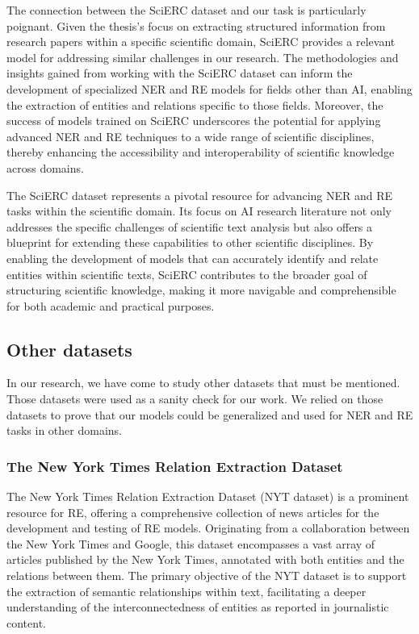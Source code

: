 The connection between the SciERC dataset and our task is particularly poignant. Given the thesis's focus on extracting structured information from research papers within a specific scientific domain, SciERC provides a relevant model for addressing similar challenges in our research. The methodologies and insights gained from working with the SciERC dataset can inform the development of specialized NER and RE models for fields other than AI, enabling the extraction of entities and relations specific to those fields. Moreover, the success of models trained on SciERC underscores the potential for applying advanced NER and RE techniques to a wide range of scientific disciplines, thereby enhancing the accessibility and interoperability of scientific knowledge across domains.

The SciERC dataset represents a pivotal resource for advancing NER and RE tasks within the scientific domain. Its focus on AI research literature not only addresses the specific challenges of scientific text analysis but also offers a blueprint for extending these capabilities to other scientific disciplines. By enabling the development of models that can accurately identify and relate entities within scientific texts, SciERC contributes to the broader goal of structuring scientific knowledge, making it more navigable and comprehensible for both academic and practical purposes.
\subsection{Other datasets}
In our research, we have come to study other datasets that must be mentioned. Those datasets were used as a sanity check for our work. We relied on those datasets to prove that our models could be generalized and used for NER and RE tasks in other domains.
\subsubsection{The New York Times Relation Extraction Dataset}

The New York Times Relation Extraction Dataset (NYT dataset) is a prominent resource for RE, offering a comprehensive collection of news articles for the development and testing of RE models. Originating from a collaboration between the New York Times and Google, this dataset encompasses a vast array of articles published by the New York Times, annotated with both entities and the relations between them\cite{NYTRE}. The primary objective of the NYT dataset is to support the extraction of semantic relationships within text, facilitating a deeper understanding of the interconnectedness of entities as reported in journalistic content.

